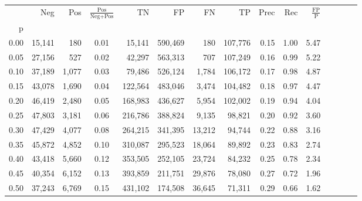 \begin{tabular}{rrrcrrrrrrrrrrr}
\toprule
{} &     Neg &    Pos & $\frac{\text{Pos}}{\text{Neg}+\text{Pos}}$ &       TN &       FP &       FN &       TP &  Prec &   Rec & $\frac{\text{FP}}{\text{P}}$ \\
p    &         &        &                                            &          &          &          &          &       &       &                              \\
\midrule
0.00 &  15,141 &    180 &                                       0.01 &   15,141 &  590,469 &      180 &  107,776 &  0.15 &  1.00 &                         5.47 \\
0.05 &  27,156 &    527 &                                       0.02 &   42,297 &  563,313 &      707 &  107,249 &  0.16 &  0.99 &                         5.22 \\
0.10 &  37,189 &  1,077 &                                       0.03 &   79,486 &  526,124 &    1,784 &  106,172 &  0.17 &  0.98 &                         4.87 \\
0.15 &  43,078 &  1,690 &                                       0.04 &  122,564 &  483,046 &    3,474 &  104,482 &  0.18 &  0.97 &                         4.47 \\
0.20 &  46,419 &  2,480 &                                       0.05 &  168,983 &  436,627 &    5,954 &  102,002 &  0.19 &  0.94 &                         4.04 \\
0.25 &  47,803 &  3,181 &                                       0.06 &  216,786 &  388,824 &    9,135 &   98,821 &  0.20 &  0.92 &                         3.60 \\
0.30 &  47,429 &  4,077 &                                       0.08 &  264,215 &  341,395 &   13,212 &   94,744 &  0.22 &  0.88 &                         3.16 \\
0.35 &  45,872 &  4,852 &                                       0.10 &  310,087 &  295,523 &   18,064 &   89,892 &  0.23 &  0.83 &                         2.74 \\
0.40 &  43,418 &  5,660 &                                       0.12 &  353,505 &  252,105 &   23,724 &   84,232 &  0.25 &  0.78 &                         2.34 \\
0.45 &  40,354 &  6,152 &                                       0.13 &  393,859 &  211,751 &   29,876 &   78,080 &  0.27 &  0.72 &                         1.96 \\
0.50 &  37,243 &  6,769 &                                       0.15 &  431,102 &  174,508 &   36,645 &   71,311 &  0.29 &  0.66 &                         1.62 \\

\end{tabular}
